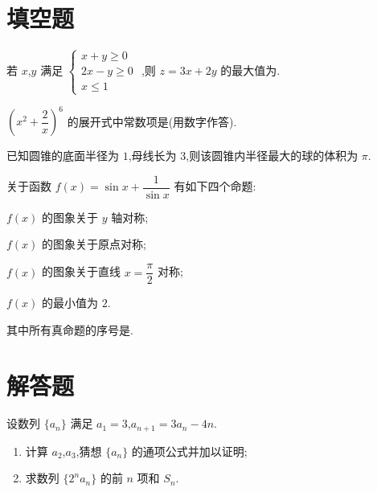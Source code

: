 \section{填空题}

\begin{problem}
若 \(x\),\(y\) 满足 \(\begin{cases}
x+y\ge0\\
2x-y\ge0\\
x\le1
\end{cases}\)
,则 \(z=3x+2y\) 的最大值为\fillinblank{}.
\end{problem}

\begin{problem}
\(\left( x^2+\dfrac{2}{x} \right)^6\) 的展开式中常数项是\fillinblank{}(用数字作答).
\end{problem}

\begin{problem}
已知圆锥的底面半径为 \(1\),母线长为 \(3\),则该圆锥内半径最大的球的体积为\fillinblank{} \(\pi\).
\end{problem}

\begin{problem}
关于函数 \(f(x)=\sin x+\dfrac{1}{\sin x}\) 有如下四个命题:

\begin{circlelist}
\item \(f(x)\) 的图象关于 \(y\) 轴对称;
\item \(f(x)\) 的图象关于原点对称;
\item \(f(x)\) 的图象关于直线 \(x=\dfrac{\pi}{2}\) 对称;
\item \(f(x)\) 的最小值为 \(2\).
\end{circlelist}

其中所有真命题的序号是\fillinblank{}.
\end{problem}

\section{解答题}

\begin{problem}
设数列 \(\{a_n\}\) 满足 \(a_1=3\),\(a_{n+1}=3a_n-4n\).

\begin{enumerate}
\item 计算 \(a_2\),\(a_3\),猜想 \(\{a_n\}\) 的通项公式并加以证明;
\item 求数列 \(\{2^na_n\}\) 的前 \(n\) 项和 \(S_n\).
\end{enumerate}
\end{problem}

